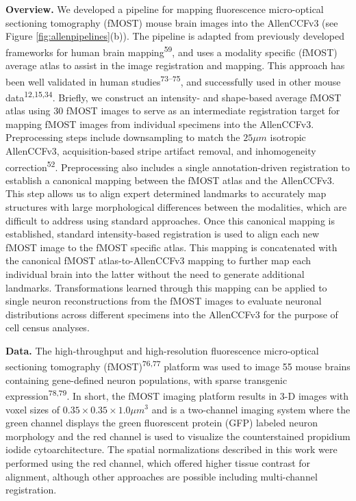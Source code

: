 \documentclass[
  12pt,
]{article}
\begin{document}
\textbf{Overview.} We developed a pipeline for mapping fluorescence
micro-optical sectioning tomography (fMOST) mouse brain images into the
AllenCCFv3 (see Figure \ref{fig:allenpipelines}(b)). The pipeline is
adapted from previously developed frameworks for human brain
mapping\textsuperscript{59}, and uses a modality specific (fMOST)
average atlas to assist in the image registration and mapping. This
approach has been well validated in human
studies\textsuperscript{73--75}, and successfully used in other mouse
data\textsuperscript{12,15,34}. Briefly, we construct an intensity- and
shape-based average fMOST atlas using 30 fMOST images to serve as an
intermediate registration target for mapping fMOST images from
individual specimens into the AllenCCFv3. Preprocessing steps include
downsampling to match the \(25 \mu m\) isotropic AllenCCFv3,
acquisition-based stripe artifact removal, and inhomogeneity
correction\textsuperscript{52}. Preprocessing also includes a single
annotation-driven registration to establish a canonical mapping between
the fMOST atlas and the AllenCCFv3. This step allows us to align expert
determined landmarks to accurately map structures with large
morphological differences between the modalities, which are difficult to
address using standard approaches. Once this canonical mapping is
established, standard intensity-based registration is used to align each
new fMOST image to the fMOST specific atlas. This mapping is
concatenated with the canonical fMOST atlas-to-AllenCCFv3 mapping to
further map each individual brain into the latter without the need to
generate additional landmarks. Transformations learned through this
mapping can be applied to single neuron reconstructions from the fMOST
images to evaluate neuronal distributions across different specimens
into the AllenCCFv3 for the purpose of cell census analyses.

\textbf{Data.} The high-throughput and high-resolution fluorescence
micro-optical sectioning tomography (fMOST)\textsuperscript{76,77}
platform was used to image 55 mouse brains containing gene-defined
neuron populations, with sparse transgenic
expression\textsuperscript{78,79}. In short, the fMOST imaging platform
results in 3-D images with voxel sizes of \(0.35 \times 0.35 \times 1.0
\mu m^3\) and is a two-channel imaging system where the green channel
displays the green fluorescent protein (GFP) labeled neuron morphology
and the red channel is used to visualize the counterstained propidium
iodide cytoarchitecture. The spatial normalizations described in this
work were performed using the red channel, which offered higher tissue
contrast for alignment, although other approaches are possible including
multi-channel registration.
\end{document}
